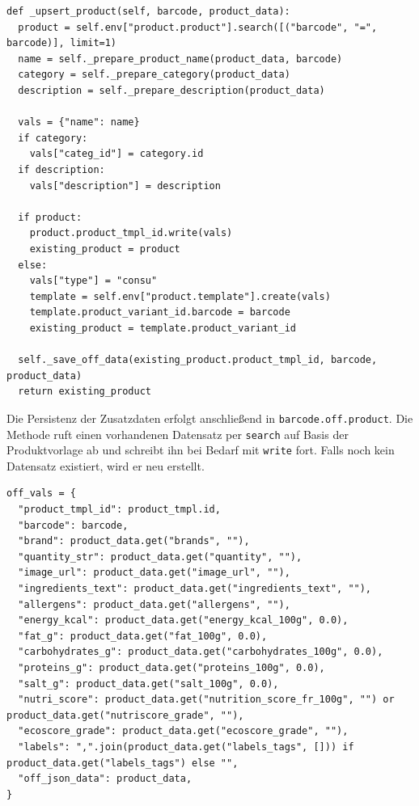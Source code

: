 \documentclass[12pt,a4paper]{article}
\begin{document}
\begin{lstlisting}[caption={Dublettenprüfung und Upsert über den ORM}, label={lst:off-upsert}]
def _upsert_product(self, barcode, product_data):
  product = self.env["product.product"].search([("barcode", "=", barcode)], limit=1)
  name = self._prepare_product_name(product_data, barcode)
  category = self._prepare_category(product_data)
  description = self._prepare_description(product_data)

  vals = {"name": name}
  if category:
    vals["categ_id"] = category.id
  if description:
    vals["description"] = description

  if product:
    product.product_tmpl_id.write(vals)
    existing_product = product
  else:
    vals["type"] = "consu"
    template = self.env["product.template"].create(vals)
    template.product_variant_id.barcode = barcode
    existing_product = template.product_variant_id

  self._save_off_data(existing_product.product_tmpl_id, barcode, product_data)
  return existing_product
\end{lstlisting}

Die Persistenz der Zusatzdaten erfolgt anschließend in \texttt{barcode.off.product}. Die Methode ruft einen vorhandenen Datensatz per \texttt{search} auf Basis der Produktvorlage ab und schreibt ihn bei Bedarf mit \texttt{write} fort. Falls noch kein Datensatz existiert, wird er neu erstellt.
\pagebreak
\begin{lstlisting}[caption={Mapping der API-Felder auf Odoo-Felder}, label={lst:off-mapping}]
off_vals = {
  "product_tmpl_id": product_tmpl.id,
  "barcode": barcode,
  "brand": product_data.get("brands", ""),
  "quantity_str": product_data.get("quantity", ""),
  "image_url": product_data.get("image_url", ""),
  "ingredients_text": product_data.get("ingredients_text", ""),
  "allergens": product_data.get("allergens", ""),
  "energy_kcal": product_data.get("energy_kcal_100g", 0.0),
  "fat_g": product_data.get("fat_100g", 0.0),
  "carbohydrates_g": product_data.get("carbohydrates_100g", 0.0),
  "proteins_g": product_data.get("proteins_100g", 0.0),
  "salt_g": product_data.get("salt_100g", 0.0),
  "nutri_score": product_data.get("nutrition_score_fr_100g", "") or product_data.get("nutriscore_grade", ""),
  "ecoscore_grade": product_data.get("ecoscore_grade", ""),
  "labels": ",".join(product_data.get("labels_tags", [])) if product_data.get("labels_tags") else "",
  "off_json_data": product_data,
}
\end{lstlisting}
\end{document}

